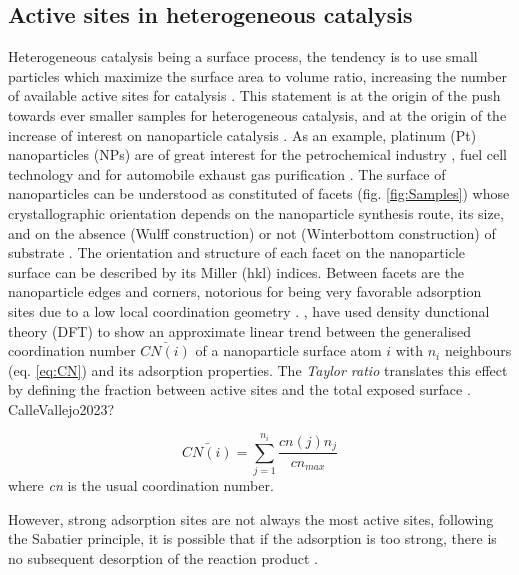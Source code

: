 \subsection{Active sites in heterogeneous catalysis}

Heterogeneous catalysis being a surface process, the tendency is to use small particles which maximize the surface area to volume ratio, increasing the number of available active sites for catalysis \parencite{Vogt2022}.
This statement is at the origin of the push towards ever smaller samples for heterogeneous catalysis, and at the origin of the increase of interest on nanoparticle catalysis \parencite{CHE1989, Molenbroek2009, vanSanten2010, Schauermann2013}.
As an example, platinum (Pt) nanoparticles (NPs) are of great interest for the petrochemical industry \parencite{Astruc2005}, fuel cell technology and for automobile exhaust gas purification \parencite{HECK2001}.
The surface of nanoparticles can be understood as constituted of facets (fig. \ref{fig:Samples}) whose crystallographic orientation depends on the nanoparticle synthesis route, its size, and on the absence (Wulff construction) or not (Winterbottom construction) of substrate \parencite{WINTERBOTTOM1967, Boukouvala2021}.
The orientation and structure of each facet on the nanoparticle surface can be described by its Miller (hkl) indices.
Between facets are the nanoparticle edges and corners, notorious for being very favorable adsorption sites due to a low local coordination geometry \parencite{Jiang2009}.
\cite{CalleVallejo2014}, \cite*{CalleVallejo2018} have used density dunctional theory (DFT) to show an approximate linear trend between the generalised coordination number $\bar{CN(i)}$ of a nanoparticle surface atom $i$ with $n_i$ neighbours (eq. \ref{eq:CN}) and its adsorption properties.
The \textit{Taylor ratio} translates this effect by defining the fraction between active sites and the total exposed surface \parencite{Taylor1925}.
\textcolor{Important}{CalleVallejo2023?}

\begin{equation}
    \bar{CN(i)} = \sum_{j=1}^{n_i} \frac{cn(j) n_j}{cn_{max}}
    \label{eq:CN}
\end{equation}
where \textit{cn} is the usual coordination number.%

However, strong adsorption sites are not always the most active sites, following the Sabatier principle, it is possible that if the adsorption is too strong, there is no subsequent desorption of the reaction product \parencite{Nilsson2005, Jiang2009}.

